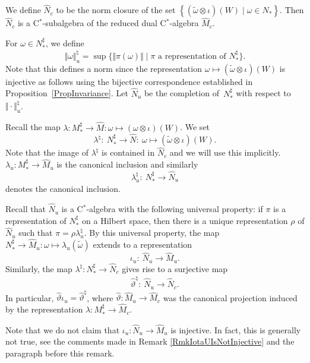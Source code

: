 We def\/ine $\hat{N}_c$ to be the norm closure of the set $\left\{ (\tilde{\omega} \otimes \iota)(W) \mid \omega \in N_\ast \right\}$. Then $\hat{N}_c$ is a C$^\ast$-subalgebra of the reduced dual C$^\ast$-algebra $\hat{M}_c$.

 For $\omega \in N_\ast^\sharp$, we def\/ine
\[
    \Vert \omega \Vert_u^\natural = \sup \big\{ \Vert \pi(\omega) \Vert \mid \pi \textrm{ a representation of } N_\ast^\sharp  \big\}.
\]
Note that this def\/ines a norm since the representation $\omega \mapsto (\tilde{\omega} \otimes \iota)(W)$ is injective as follows using the bijective correspondence established in Proposition~\ref{PropInvariance}.
 Let $\hat{N}_u$ be the completion of~$N_\ast^\sharp$ with respect to~$\Vert \cdot \Vert_u^\natural$.



Recall the map $\lambda: M_\ast^\sharp \rightarrow \hat{M}: \omega \mapsto (\omega \otimes \iota)(W)$. We set
\[
\lambda^\natural: \ N_\ast^\sharp \rightarrow \hat{N}: \ \omega \mapsto (\tilde{\omega} \otimes \iota)(W).
\]
  Note that the image of $\lambda^\natural$ is contained in $\hat{N}_c$ and we will use this implicitly. $\lambda_u: M_\ast^\sharp \rightarrow \hat{M}_u$ is the canonical inclusion and similarly
\[
\lambda_u^\natural: \ N_\ast^\sharp \rightarrow \hat{N}_u
\]
 denotes the canonical inclusion.

Recall that $\hat{N}_u$ is a C$^\ast$-algebra with the following universal property: if $\pi$ is a representation of $N_\ast^\sharp$ on a Hilbert space, then there is a unique representation $\rho$ of $\hat{N}_u$ such that $\pi = \rho \lambda_u^\natural$.  By this universal property, the map $N_\ast^\sharp \rightarrow \hat{M}_u: \omega \mapsto \lambda_u(\tilde{\omega}) $ extends to a representation
\[
\iota_u: \ \hat{N}_u \rightarrow \hat{M}_u.
\]
  Similarly, the map $\lambda^\natural: N_\ast^\sharp \rightarrow \hat{N}_c$ gives rise to a surjective map
 \[
\hat{\vartheta}^\natural: \ \hat{N}_u \rightarrow \hat{N}_c.
\]
 In particular, $\hat{\vartheta} \iota_u = \hat{\vartheta}^\natural$, where $\hat{\vartheta}: \hat{M}_u \rightarrow \hat{M}_c$ was the canonical projection induced by the representation $\lambda: M_\ast^\sharp \rightarrow \hat{M}_c$.

\begin{rmk}
Note that we do not claim that $\iota_u: \hat{N}_u \rightarrow \hat{M}_u$ is injective. In fact, this is generally not true, see the comments made in Remark \ref{RmkIotaUIsNotInjective} and the paragraph before this remark.
\end{rmk}

